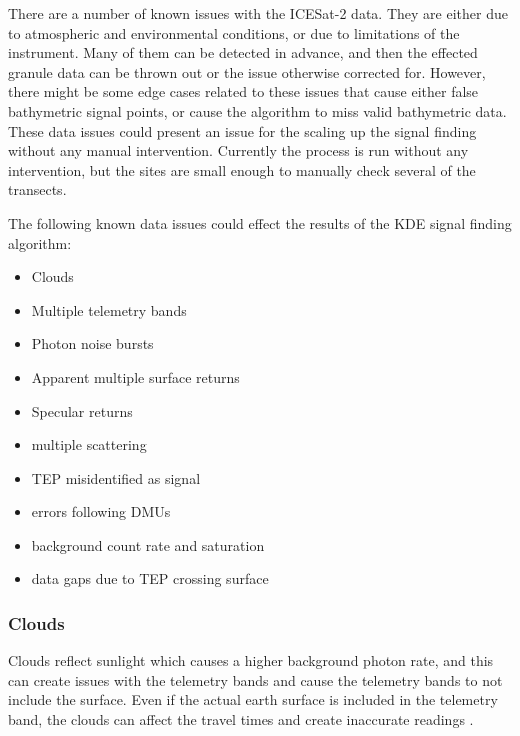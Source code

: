 There are a number of known issues with the ICESat-2 data. They are either due to atmospheric and environmental conditions, or due to limitations of the instrument. Many of them can be detected in advance, and then the effected granule data can be thrown out or the issue otherwise corrected for. However, there might be some edge cases related to these issues that cause either false bathymetric signal points, or cause the algorithm to miss valid bathymetric data. These data issues could present an issue for the scaling up the signal finding without any manual intervention. Currently the process is run without any intervention, but the sites are small enough to manually check several of the transects.

The following known data issues could effect the results of the KDE signal finding algorithm:

\begin{itemize}
    \item Clouds
    \item Multiple telemetry bands
    \item Photon noise bursts %
    \item Apparent multiple surface returns %
    \item Specular returns
    \item multiple scattering %
    \item TEP misidentified as signal %
    \item errors following DMUs %
    \item background count rate and saturation
    \item data gaps due to TEP crossing surface %
\end{itemize}

\subsubsection{Clouds}

Clouds reflect sunlight which causes a higher background photon rate, and this can create issues with the telemetry bands and cause the telemetry bands to not include the surface. Even if the actual earth surface is included in the telemetry band, the clouds can affect the travel times and create inaccurate readings \parencite{atl03knownissues}.

